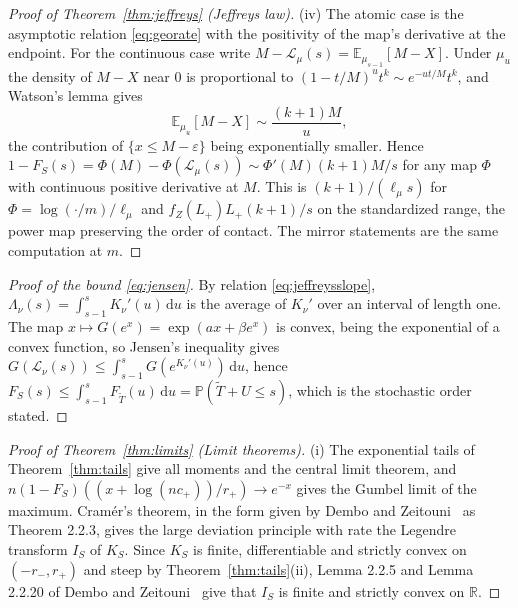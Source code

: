 \documentclass[sn-mathphys-num]{sn-jnl}\newcommand{\SNJNL}{}
\theoremstyle{thmstyleone}
\theoremstyle{thmstyletwo}
\theoremstyle{thmstylethree}
\theoremstyle{thmstyleone}
\providecommand{\R}{\mathbb{R}}
\providecommand{\E}{\mathbb{E}}
\providecommand{\Prob}{\mathbb{P}}
\providecommand{\Leh}{\mathscr{L}}
\providecommand{\dd}{\,\mathrm{d}}
\begin{document}
\begin{appendices}
\begin{proof}[Proof of Theorem~\ref{thm:jeffreys} (Jeffreys law)]
			\noindent(iv) The atomic case is
			the asymptotic relation \eqref{eq:georate} with the positivity of the map's derivative at
			the endpoint. For the continuous case write
			$M-\Leh_\mu(s)=\E_{\mu_{s-1}}[M-X]$. Under $\mu_u$ the density of
			$M-X$ near $0$ is proportional to $(1-t/M)^{u}t^{k}\sim e^{-ut/M}t^{k}$,
			and Watson's lemma gives
			\begin{equation}\label{eq:watson}
				\E_{\mu_u}[M-X]\sim\frac{(k+1)M}{u},
			\end{equation}
			the contribution of $\{x\le M-\varepsilon\}$ being exponentially
			smaller. Hence $1-F_S(s)=\Phi(M)-\Phi(\Leh_\mu(s))\sim\Phi'(M)(k+1)M/s$
			for any map $\Phi$ with continuous positive derivative at $M$. This
			is $(k+1)/(\ell_\mu s)$ for $\Phi=\log(\cdot/m)/\ell_\mu$ and
			$f_Z(L_+)L_+(k+1)/s$ on the standardized range, the power map
			preserving the order of contact. The mirror statements are the
			same computation at $m$.
		\end{proof}
		
		\begin{proof}[Proof of the bound \eqref{eq:jensen}]
			By relation \eqref{eq:jeffreysslope}, $\Lambda_\nu(s)=\int_{s-1}^{s}K_\nu'(u)\dd u$
			is the average of $K_\nu'$ over an interval of length one. The map
			$x\mapsto G(e^{x})=\exp(ax+\beta e^{x})$ is convex, being the
			exponential of a convex function, so Jensen's inequality gives
			$G(\Leh_\nu(s))\le\int_{s-1}^{s}G(e^{K_\nu'(u)})\dd u$, hence
			$F_S(s)\le\int_{s-1}^{s}F_{\widetilde T}(u)\dd u=\Prob(\widetilde T+U\le s)$,
			which is the stochastic order stated.
		\end{proof}
		
		\begin{proof}[Proof of Theorem~\ref{thm:limits} (Limit theorems)]\leavevmode
			
			\noindent(i) The exponential tails of Theorem~\ref{thm:tails} give all
			moments and the central limit theorem, and
			$n(1-F_S)((x+\log(nc_+))/r_+)\to e^{-x}$ gives the Gumbel limit of
			the maximum. Cram\'er's theorem, in the form given by Dembo and
			Zeitouni~\cite{dembo1998} as Theorem 2.2.3, gives the large
			deviation principle with rate the Legendre transform $I_S$ of
			$K_S$. Since $K_S$ is finite, differentiable and strictly convex
			on $(-r_-,r_+)$ and steep by Theorem~\ref{thm:tails}(ii), Lemma
			2.2.5 and Lemma 2.2.20 of Dembo and Zeitouni~\cite{dembo1998} give
			that $I_S$ is finite and strictly convex on $\R$.
			

\end{proof}
\end{appendices}
\end{document}
